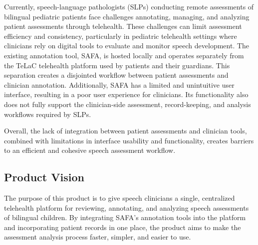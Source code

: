 \documentclass[12pt]{article}
\begin{document}
Currently, speech-language pathologists (SLPs) conducting remote assessments of bilingual pediatric patients face challenges annotating, managing, and analyzing patient assessments through telehealth. These challenges can limit assessment efficiency and consistency, particularly in pediatric telehealth settings where clinicians rely on digital tools to evaluate and monitor speech development. The existing annotation tool, SAFA, is hosted locally and operates separately from the TeLaC telehealth platform used by patients and their guardians. This separation creates a disjointed workflow between patient assessments and clinician annotation. Additionally, SAFA has a limited and unintuitive user interface, resulting in a poor user experience for clinicians. Its functionality also does not fully support the clinician-side assessment, record-keeping, and analysis workflows required by SLPs.

Overall, the lack of integration between patient assessments and clinician tools, combined with limitations in interface usability and functionality, creates barriers to an efficient and cohesive speech assessment workflow.

\subsection{Product Vision}

The purpose of this product is to give speech clinicians a single, centralized telehealth platform for reviewing, annotating, and analyzing speech assessments of bilingual children. 
By integrating SAFA’s annotation tools into the platform and incorporating patient records in one place, the product aims to make the assessment analysis process faster, simpler, and easier to use.
\end{document}

